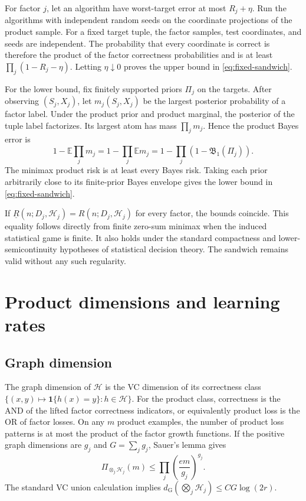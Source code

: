 \documentclass{article}
\theoremstyle{definition}
\theoremstyle{remark}
\newcommand{\E}{\mathbb E}
\newcommand{\cH}{\mathcal H}
\newcommand{\Bayes}{\mathfrak B}
\newcommand{\Gdim}{d_{\mathrm G}}
\newcommand{\1}{\mathbf 1}
\begin{document}
For factor \(j\), let an algorithm have worst-target error at most \(R_j+\eta\). Run the algorithms with independent random seeds on the coordinate projections of the product sample. For a fixed target tuple, the factor samples, test coordinates, and seeds are independent. The probability that every coordinate is correct is therefore the product of the factor correctness probabilities and is at least \(\prod_j(1-R_j-\eta)\). Letting \(\eta\downarrow0\) proves the upper bound in \eqref{eq:fixed-sandwich}.

For the lower bound, fix finitely supported priors \(\Pi_j\) on the targets. After observing \((S_j,X_j)\), let \(m_j(S_j,X_j)\) be the largest posterior probability of a factor label. Under the product prior and product marginal, the posterior of the tuple label factorizes. Its largest atom has mass \(\prod_jm_j\). Hence the product Bayes error is \[ 1-\E\prod_jm_j =1-\prod_j\E m_j =1-\prod_j(1-\Bayes_1(\Pi_j)). \] The minimax product risk is at least every Bayes risk. Taking each prior arbitrarily close to its finite-prior Bayes envelope gives the lower bound in \eqref{eq:fixed-sandwich}.

If \(\underline R(n;D_j,\cH_j)=R(n;D_j,\cH_j)\) for every factor, the bounds coincide. This equality follows directly from finite zero-sum minimax when the induced statistical game is finite. It also holds under the standard compactness and lower-semicontinuity hypotheses of statistical decision theory. The sandwich remains valid without any such regularity.

\section{Product dimensions and learning rates}
\label{app:dimensions}

\subsection{Graph dimension}

The graph dimension of \(\cH\) is the VC dimension of its correctness class \(\{(x,y)\mapsto\1\{h(x)=y\}:h\in\cH\}\). For the product class, correctness is the AND of the lifted factor correctness indicators, or equivalently product loss is the OR of factor losses. On any \(m\) product examples, the number of product loss patterns is at most the product of the factor growth functions. If the positive graph dimensions are \(g_j\) and \(G=\sum_jg_j\), Sauer's lemma gives \[ \Pi_{\otimes_j\cH_j}(m) \le\prod_j\left(\frac{em}{g_j}\right)^{g_j}. \] The standard VC union calculation \citep{vandervaart2009vc} implies \(\Gdim(\bigotimes_j\cH_j)\le C G\log(2r)\).
\end{document}
